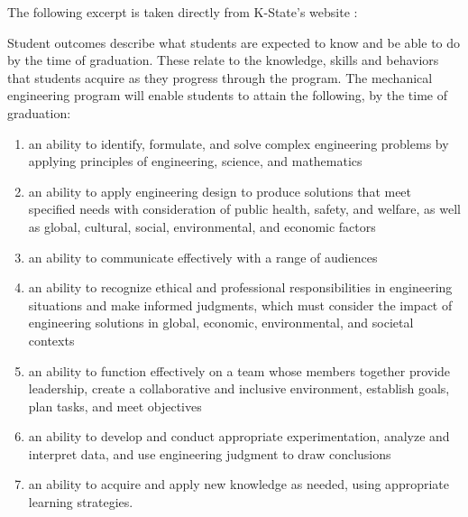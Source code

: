 The following excerpt is taken directly from K-State's website \cite{abet}:

Student outcomes describe what students are expected to know and be 
able to do by the time of graduation. These relate to the knowledge, 
skills and behaviors that students acquire as they progress through 
the program. The mechanical engineering program will enable students 
to attain the following, by the time of graduation:
\begin{enumerate}
    \item an ability to identify, formulate, and solve complex engineering problems by applying principles of engineering, science, and mathematics
    \item an ability to apply engineering design to produce solutions that meet specified needs with consideration of public health, safety, and welfare, as well as global, cultural, social, environmental, and economic factors
    \item an ability to communicate effectively with a range of audiences
    \item an ability to recognize ethical and professional responsibilities in engineering situations and make informed judgments, which must consider the impact of engineering solutions in global, economic, environmental, and societal contexts
    \item an ability to function effectively on a team whose members together provide leadership, create a collaborative and inclusive environment, establish goals, plan tasks, and meet objectives
    \item an ability to develop and conduct appropriate experimentation, analyze and interpret data, and use engineering judgment to draw conclusions
    \item an ability to acquire and apply new knowledge as needed, using appropriate learning strategies.
\end{enumerate}